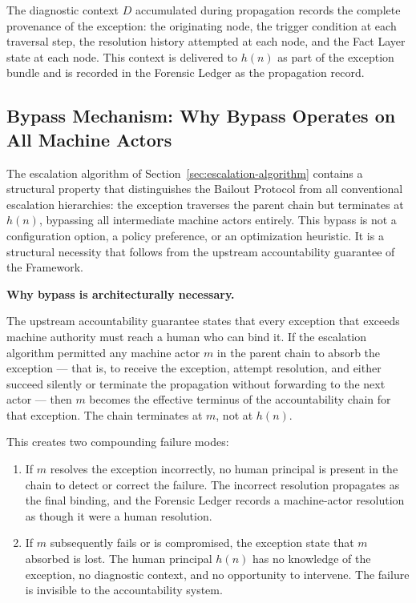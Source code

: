 The diagnostic context $D$ accumulated during propagation records the complete provenance of the exception: the originating node, the trigger condition at each traversal step, the resolution history attempted at each node, and the Fact Layer state at each node. This context is delivered to $h(n)$ as part of the exception bundle and is recorded in the Forensic Ledger as the propagation record.

\subsection{Bypass Mechanism: Why Bypass Operates on All Machine Actors}\label{sec:bypass}

The escalation algorithm of Section~\ref{sec:escalation-algorithm} contains a structural property that distinguishes the Bailout Protocol from all conventional escalation hierarchies: the exception traverses the parent chain but terminates at $h(n)$, bypassing all intermediate machine actors entirely. This bypass is not a configuration option, a policy preference, or an optimization heuristic. It is a structural necessity that follows from the upstream accountability guarantee of the \bxthree{} Framework.

\bigskip
\noindent\textbf{Why bypass is architecturally necessary.}

The upstream accountability guarantee states that every exception that exceeds machine authority must reach a human who can bind it. If the escalation algorithm permitted any machine actor $m$ in the parent chain to absorb the exception --- that is, to receive the exception, attempt resolution, and either succeed silently or terminate the propagation without forwarding to the next actor --- then $m$ becomes the effective terminus of the accountability chain for that exception. The chain terminates at $m$, not at $h(n)$.

This creates two compounding failure modes:

\begin{enumerate}\itemsep=0pt
\item If $m$ resolves the exception incorrectly, no human principal is present in the chain to detect or correct the failure. The incorrect resolution propagates as the final binding, and the Forensic Ledger records a machine-actor resolution as though it were a human resolution.

\item If $m$ subsequently fails or is compromised, the exception state that $m$ absorbed is lost. The human principal $h(n)$ has no knowledge of the exception, no diagnostic context, and no opportunity to intervene. The failure is invisible to the accountability system.
\end{enumerate}

